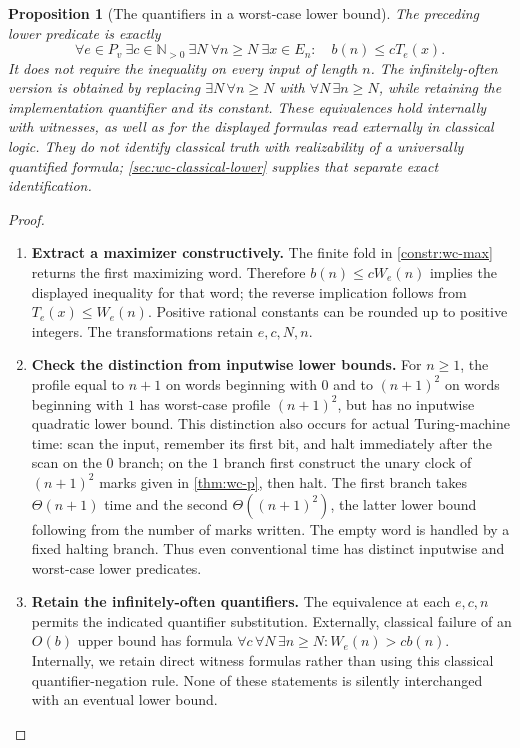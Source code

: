 \documentclass[11pt,a4paper]{article}
\numberwithin{algorithm}{section}
\numberwithin{equation}{section}
\newtheorem{proposition}[proposition]{Proposition}
\theoremstyle{definition}
\theoremstyle{remark}
\theoremstyle{plain}
\newcommand{\N}{\mathbb N}
\theoremstyle{definition}
\theoremstyle{plain}
\begin{document}
\begin{proposition}[The quantifiers in a worst-case lower bound]
\label{prop:wc-lower}
The preceding lower predicate is exactly
\[
 \forall e\in P_v\ \exists c\in\N_{>0}\ \exists N\ \forall n\ge N\
 \exists x\in E_n:\quad b(n)\le cT_e(x).
\]
It does not require the inequality on every input of length $n$.
The infinitely-often version is obtained by replacing
$\exists N\,\forall n\ge N$ with $\forall N\,\exists n\ge N$,
while retaining the implementation quantifier and its constant.
These equivalences hold internally with witnesses, as well as for the
displayed formulas read externally in classical logic. They do not identify
classical truth with realizability of a universally quantified formula;
\cref{sec:wc-classical-lower} supplies that separate exact identification.
\end{proposition}
\begin{proof}\leavevmode
\begin{enumerate}[leftmargin=*,align=left]
\item \textbf{Extract a maximizer constructively.}
The finite fold in \cref{constr:wc-max} returns the first maximizing
word. Therefore $b(n)\le cW_e(n)$ implies the displayed inequality
for that word; the reverse implication follows from $T_e(x)\le W_e(n)$.
Positive rational constants can be rounded up to positive integers.
The transformations retain $e,c,N,n$.
\item \textbf{Check the distinction from inputwise lower bounds.}
For $n\ge1$, the profile equal to $n+1$ on words beginning with $0$
and to $(n+1)^2$ on words beginning with $1$ has worst-case profile
$(n+1)^2$, but has no inputwise quadratic lower bound. This distinction
also occurs for actual Turing-machine time: scan the input, remember
its first bit, and halt immediately after the scan on the $0$ branch;
on the $1$ branch first construct the unary clock of $(n+1)^2$ marks
given in \cref{thm:wc-p}, then halt. The first branch takes
$\Theta(n+1)$ time and the second $\Theta((n+1)^2)$, the latter
lower bound following from the number of marks written. The empty
word is handled by a fixed halting branch. Thus even conventional
time has distinct inputwise and worst-case lower predicates.
\item \textbf{Retain the infinitely-often quantifiers.}
The equivalence at each $e,c,n$ permits the indicated quantifier
substitution. Externally, classical failure of an $O(b)$ upper bound
has formula $\forall c\,\forall N\,\exists n\ge N:
W_e(n)>cb(n)$. Internally, we retain direct witness formulas rather
than using this classical quantifier-negation rule. None of these
statements is silently interchanged with an eventual lower bound.
\end{enumerate}
\end{proof}
\end{document}
